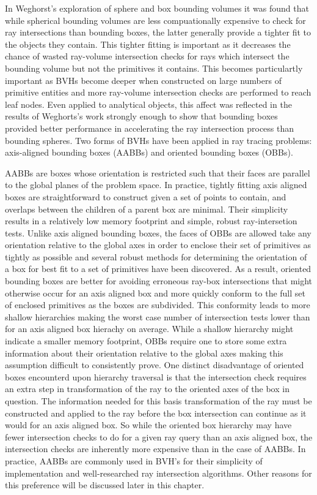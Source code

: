 \documentclass[12pt, a4paper]{article}
\begin{document}
In Weghorst's exploration of sphere and box bounding volumes it was found that while spherical bounding volumes are less compuationally expensive to check for ray intersections than bounding boxes, the latter generally provide a tighter fit to the objects they contain. This tighter fitting is important as it decreases the chance of wasted ray-volume intersection checks for rays which intersect the bounding volume but not the primitives it contains. This becomes particulartly important as BVHs become deeper when constructed on large numbers of primitive entities and more ray-volume intersection checks are performed to reach leaf nodes. Even applied to analytical objects, this affect was reflected in the results of Weghorts's work strongly enough to show that bounding boxes provided better performance in accelerating the ray intersection process than bounding spheres. Two forms of BVHs have been applied in ray tracing problems: axis-aligned bounding boxes (AABBs) and oriented bounding boxes (OBBs).

AABBs are boxes whose orientation is restricted such that their faces are parallel to the global planes of the problem space. In practice, tightly fitting axis aligned boxes are straightforward to construct given a set of points to contain, and overlaps between the children of a parent box are minimal. Their simplicity results in a relatively low memory footprint and simple, robust ray-intersetion tests. Unlike axis aligned bounding boxes, the faces of OBBs are allowed take any orientation relative to the global axes in order to enclose their set of primitives as tightly as possible and several robust methods for determining the orientation of a box for best fit to a set of primitives have been discovered.\cite{gottschalk1996obbtree,ORourke_1985} As a result, oriented bounding boxes are better for avoiding erroneous ray-box intersections that might otherwise occur for an axis aligned box and more quickly conform to the full set of enclosed primitives as the boxes are subdivided. This conformity leads to more shallow hierarchies making the worst case number of intersection tests lower than for an axis aligned box hierachy on average. While a shallow hierarchy might indicate a smaller memory footprint, OBBs require one to store some extra information about their orientation relative to the global axes making this assumption difficult to consistently prove. One distinct disadvantage of oriented boxes encounterd upon hierarchy traversal is that the intersection check requires an extra step in transformation of the ray to the oriented axes of the box in question. The information needed for this basis transformation of the ray must be constructed and applied to the ray before the box intersection can continue as it would for an axis aligned box. So while the oriented box hierarchy may have fewer intersection checks to do for a given ray query than an axis aligned box, the intersection checks are inherently more expensive than in the case of AABBs. In practice, AABBs are commonly used in BVH's for their simplicity of implementation and well-researched ray intersection algorithms. Other reasons for this preference will be discussed later in this chapter.
\end{document}
